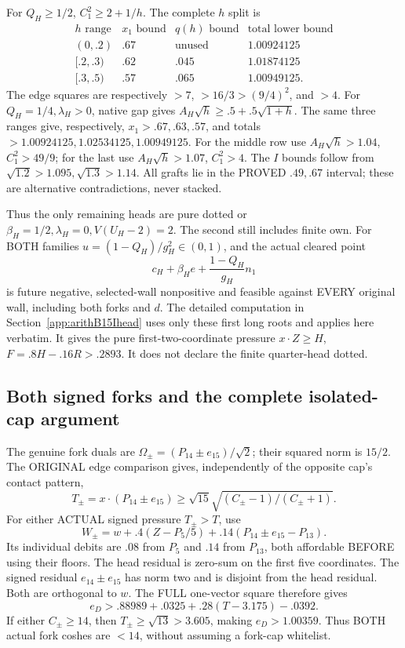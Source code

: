 \documentclass[11pt]{article}
\begin{document}
For \(Q_H\ge1/2\), \(C_1^2\ge2+1/h\).
The complete \(h\) split is
\[
\begin{array}{c|c|c|c}
 h\text{ range}&x_1\text{ bound}&q(h)\text{ bound}
                            &\text{total lower bound}\\ \hline
(0,.2)&.67&\text{unused}&1.00924125\\
{}[.2,.3)&.62&.045&1.01874125\\
{}[.3,.5)&.57&.065&1.00949125 .
\end{array}
\]
The edge squares are respectively \(>7\),
\(>16/3>(9/4)^2\), and \(>4\).
For \(Q_H=1/4,\lambda_H>0\), native gap gives
\(A_H\sqrt h\ge.5+.5\sqrt{1+h}\).
The same three ranges give, respectively,
\(x_1>.67,.63,.57\), and totals
\(>1.00924125,1.02534125,1.00949125\).
For the middle row use \(A_H\sqrt h>1.04\),
\(C_1^2>49/9\); for the last use
\(A_H\sqrt h>1.07\), \(C_1^2>4\).
The \(I\) bounds follow from
\(\sqrt{1.2}>1.095,\sqrt{1.3}>1.14\).
All grafts lie in the PROVED \(.49,.67\) interval;
these are alternative contradictions, never stacked.

Thus the only remaining heads are pure dotted or
\(\beta_H=1/2,\lambda_H=0,V(U_H-2)=2\).
The second still includes finite own.
For BOTH families \(u=(1-Q_H)/g_H^2\in(0,1)\),
and the actual cleared point
\[
                  c_H+\beta_He+{\frac{1-Q_H}{g_H}}n_1
\]
is future negative, selected-wall nonpositive and
feasible against EVERY original wall, including both
forks and \(d\).
The detailed computation in
Section~\ref{app:arithB15Ihead} uses only these
first long roots and applies here verbatim.
It gives the pure first-two-coordinate pressure
\(x\cdot Z\ge H\), \(F=.8H-.16R>.2893\).
It does not declare the finite quarter-head dotted.

\subsection{Both signed forks and the complete isolated-cap argument}
\label{app:arithD15Iforkisolated}

The genuine fork duals are
\(\Omega_\pm=(P_{14}\pm e_{15})/\sqrt2\);
their squared norm is \(15/2\).
The ORIGINAL edge comparison gives, independently
of the opposite cap's contact pattern,
\[
 T_\pm=x\cdot(P_{14}\pm e_{15})
       \ge\sqrt{15}\sqrt{(C_\pm-1)/(C_\pm+1)} .
\]
For either ACTUAL signed pressure \(T_\pm>T\), use
\[
          W_\pm=w+.4(Z-P_5/5)
                     +.14(P_{14}\pm e_{15}-P_{13}).
\]
Its individual debits are \(.08\) from \(P_5\)
and \(.14\) from \(P_{13}\), both affordable BEFORE
using their floors.
The head residual is zero-sum on the first five
coordinates.
The signed residual \(e_{14}\pm e_{15}\) has norm
two and is disjoint from the head residual.
Both are orthogonal to \(w\).
The FULL one-vector square therefore gives
\[
 e_D>.88989+.0325+.28(T-3.175)-.0392 .
\tag{DF}\label{eq:arithD15Iforkbudget}
\]
If either \(C_\pm\ge14\), then
\(T_\pm\ge\sqrt{13}>3.605\), making \(e_D>1.00359\).
Thus BOTH actual fork coshes are \(<14\),
without assuming a fork-cap whitelist.
\end{document}
